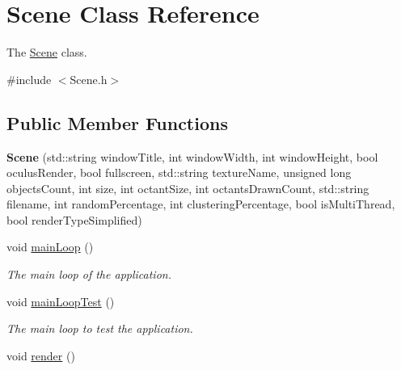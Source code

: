 \hypertarget{classScene}{}\section{Scene Class Reference}
\label{classScene}


The \hyperlink{classScene}{Scene} class.  




{\ttfamily \#include $<$Scene.\+h$>$}

\subsection*{Public Member Functions}
\begin{DoxyCompactItemize}
\item 
\hypertarget{classScene_aeb61892e50f410db3fd84be5037a1e3c}{}{\bfseries Scene} (std\+::string window\+Title, int window\+Width, int window\+Height, bool oculus\+Render, bool fullscreen, std\+::string texture\+Name, unsigned long objects\+Count, int size, int octant\+Size, int octants\+Drawn\+Count, std\+::string filename, int random\+Percentage, int clustering\+Percentage, bool is\+Multi\+Thread, bool render\+Type\+Simplified)\label{classScene_aeb61892e50f410db3fd84be5037a1e3c}

\item 
\hypertarget{classScene_ab81ad242d6c35a24cfffb693b343cd20}{}void \hyperlink{classScene_ab81ad242d6c35a24cfffb693b343cd20}{main\+Loop} ()\label{classScene_ab81ad242d6c35a24cfffb693b343cd20}

\begin{DoxyCompactList}\small\item\em The main loop of the application. \end{DoxyCompactList}\item 
\hypertarget{classScene_ae0a213f3b0461622c7a5124362975603}{}void \hyperlink{classScene_ae0a213f3b0461622c7a5124362975603}{main\+Loop\+Test} ()\label{classScene_ae0a213f3b0461622c7a5124362975603}

\begin{DoxyCompactList}\small\item\em The main loop to test the application. \end{DoxyCompactList}\item 
\hypertarget{classScene_a4ddf2d16f371ee9533b3faf1dd5ddfb1}{}void \hyperlink{classScene_a4ddf2d16f371ee9533b3faf1dd5ddfb1}{render} ()\label{classScene_a4ddf2d16f371ee9533b3faf1dd5ddfb1}


\end{DoxyCompactItemize}
